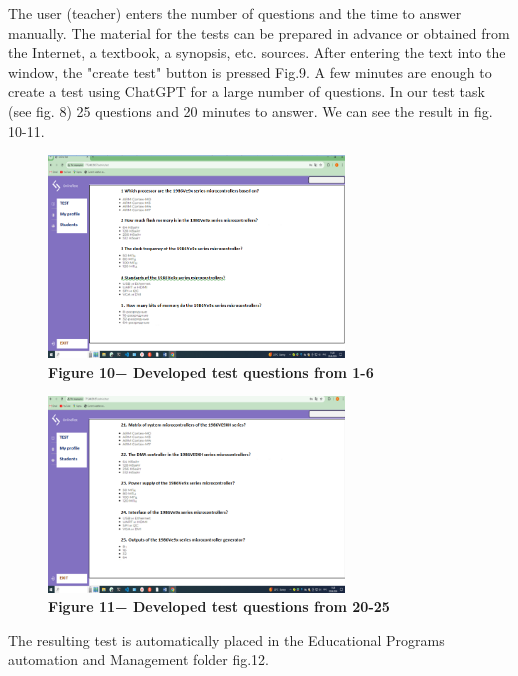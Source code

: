 \begin{multicols}{2}

The user (teacher) enters the number of questions and the time to answer
manually. The material for the tests can be prepared in advance or
obtained from the Internet, a textbook, a synopsis, etc. sources. After
entering the text into the window, the "create test" button is pressed
Fig.9. A few minutes are enough to create a test using ChatGPT for a
large number of questions. In our test task (see fig. 8) 25 questions
and 20 minutes to answer. We can see the result in fig. 10-11.
\end{multicols}



\begin{figure}[H]
	\centering
	\includegraphics[width=0.7\textwidth]{assets/135}
	\caption*{\bfseries Figure 10− Developed test questions from 1-6}
\end{figure}


\begin{figure}[H]
	\centering
	\includegraphics[width=0.7\textwidth]{assets/136}
	\caption*{\bfseries Figure 11− Developed test questions from 20-25}
\end{figure}

\begin{multicols}{2}
The resulting test is automatically placed in the Educational Programs
automation and Management folder fig.12.
\end{multicols}

